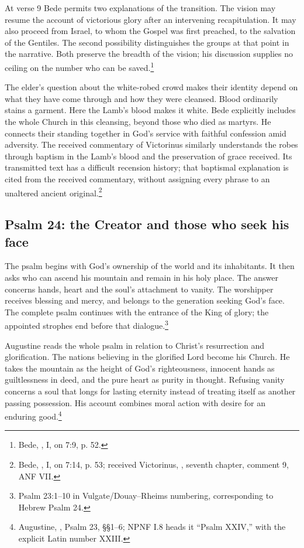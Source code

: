 At verse 9 Bede permits two explanations of the transition. The vision may resume the account of victorious glory after an intervening recapitulation. It may also proceed from Israel, to whom the Gospel was first preached, to the salvation of the Gentiles. The second possibility distinguishes the groups at that point in the narrative. Both preserve the breadth of the vision; his discussion supplies no ceiling on the number who can be saved.\footnote{Bede, , I, on 7:9, p. 52.}

The elder's question about the white-robed crowd makes their identity depend on what they have come through and how they were cleansed. Blood ordinarily stains a garment. Here the Lamb's blood makes it white. Bede explicitly includes the whole Church in this cleansing, beyond those who died as martyrs. He connects their standing together in God's service with faithful confession amid adversity. The received commentary of Victorinus similarly understands the robes through baptism in the Lamb's blood and the preservation of grace received. Its transmitted text has a difficult recension history; that baptismal explanation is cited from the received commentary, without assigning every phrase to an unaltered ancient original.\footnote{Bede, , I, on 7:14, p. 53; received Victorinus, , seventh chapter, comment 9, ANF VII.}

\subsection{Psalm 24: the Creator and those who seek his face}
The psalm begins with God's ownership of the world and its inhabitants. It then asks who can ascend his mountain and remain in his holy place. The answer concerns hands, heart and the soul's attachment to vanity. The worshipper receives blessing and mercy, and belongs to the generation seeking God's face. The complete psalm continues with the entrance of the King of glory; the appointed strophes end before that dialogue.\footnote{Psalm 23:1--10 in Vulgate/Douay--Rheims numbering, corresponding to Hebrew Psalm 24.}

Augustine reads the whole psalm in relation to Christ's resurrection and glorification. The nations believing in the glorified Lord become his Church. He takes the mountain as the height of God's righteousness, innocent hands as guiltlessness in deed, and the pure heart as purity in thought. Refusing vanity concerns a soul that longs for lasting eternity instead of treating itself as another passing possession. His account combines moral action with desire for an enduring good.\footnote{Augustine, , Psalm 23, §§1--6; NPNF I.8 heads it ``Psalm XXIV,'' with the explicit Latin number XXIII.}

